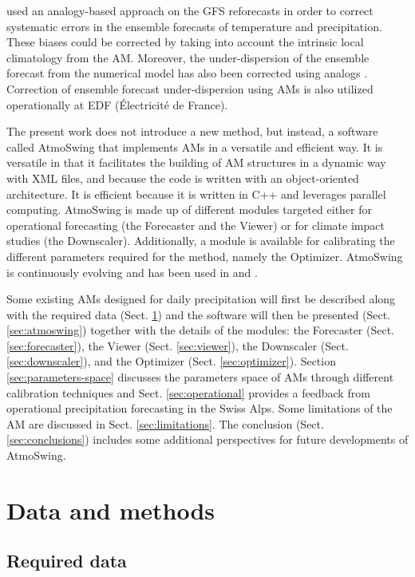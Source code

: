 \documentclass[gmdd]{copernicus}
\begin{document}
\citet{Hamill2006} used an analogy-based approach on the GFS reforecasts in order to correct systematic errors in the ensemble forecasts of temperature and precipitation. These biases could be corrected by taking into account the intrinsic local climatology from the AM. Moreover, the under-dispersion of the ensemble forecast from the numerical model has also been corrected using analogs \citep{Hamill2006}. Correction of ensemble forecast under-dispersion using AMs is also utilized operationally at EDF (\'{E}lectricit\'{e} de France).

The present work does not introduce a new method, but instead, a software called AtmoSwing that implements AMs in a versatile and efficient way. It is versatile in that it facilitates the building of AM structures in a dynamic way with XML files, and because the code is written with an object-oriented architecture. It is efficient because it is written in C++ and leverages parallel computing. AtmoSwing is made up of different modules targeted either for operational forecasting (the Forecaster and the Viewer) or for climate impact studies (the Downscaler). Additionally, a module is available for calibrating the different parameters required for the method, namely the Optimizer. AtmoSwing is continuously evolving and has been used in \citet{Horton2012, Horton2017a, Horton2017b, Horton2018a} and \citet{Horton2018b}.

Some existing AMs designed for daily precipitation will first be described along with the required data (Sect. \ref{sec:data_methods}) and the software will then be presented (Sect. \ref{sec:atmoswing}) together with the details of the modules: the Forecaster (Sect. \ref{sec:forecaster}), the Viewer (Sect. \ref{sec:viewer}), the Downscaler (Sect. \ref{sec:downscaler}), and the Optimizer (Sect. \ref{sec:optimizer}). Section \ref{sec:parameters-space} discusses the parameters space of AMs through different calibration techniques and Sect. \ref{sec:operational} provides a feedback from operational precipitation forecasting in the Swiss Alps. Some limitations of the AM are discussed in Sect. \ref{sec:limitations}. The conclusion (Sect. \ref{sec:conclusions}) includes some additional perspectives for future developments of AtmoSwing. 


\section{Data and methods}
\label{sec:data_methods}


\subsection{Required data}
\label{sec:data}
\end{document}
